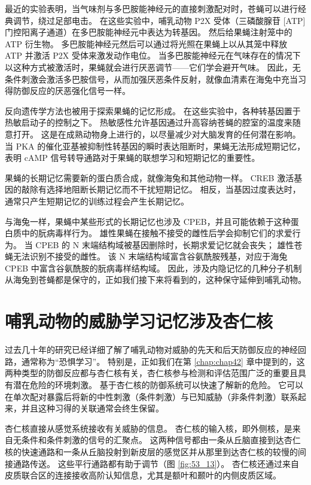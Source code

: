 最近的实验表明，当气味剂与多巴胺能神经元的直接刺激配对时，苍蝇可以进行经典调节，绕过足部电击。
在这些实验中，哺乳动物 P2X 受体（三磷酸腺苷 [ATP] 门控阳离子通道）在多巴胺能神经元中表达为转基因。
然后给果蝇注射笼中的 ATP 衍生物。
多巴胺能神经元然后可以通过将光照在果蝇上以从其笼中释放 ATP 并激活 P2X 受体来激发动作电位。
当多巴胺能神经元在气味存在的情况下以这种方式被激活时，果蝇就会进行厌恶调节——它们学会避开气味。
因此，无条件刺激会激活多巴胺信号，从而加强厌恶条件反射，就像血清素在海兔中充当习得防御反应的厌恶强化信号一样。


反向遗传学方法也被用于探索果蝇的记忆形成。
在这些实验中，各种转基因置于热敏启动子的控制之下。
热敏感性允许基因通过升高容纳苍蝇的腔室的温度来随意打开。
这是在成熟动物身上进行的，以尽量减少对大脑发育的任何潜在影响。
当 PKA 的催化亚基被抑制性转基因的瞬时表达阻断时，果蝇无法形成短期记忆，表明 cAMP 信号转导通路对于果蝇的联想学习和短期记忆的重要性。


果蝇的长期记忆需要新的蛋白质合成，就像海兔和其他动物一样。
CREB 激活基因的敲除有选择地阻断长期记忆而不干扰短期记忆。
相反，当基因过度表达时，通常只产生短期记忆的训练过程会产生长期记忆。


与海兔一样，果蝇中某些形式的长期记忆也涉及 CPEB，并且可能依赖于这种蛋白质中的朊病毒样行为。
雄性果蝇在接触不接受的雌性后学会抑制它们的求爱行为。
当 CPEB 的 N 末端结构域被基因删除时，长期求爱记忆就会丧失；
雄性苍蝇无法识别不接受的雌性。
该 N 末端结构域富含谷氨酰胺残基，对应于海兔 CPEB 中富含谷氨酰胺的朊病毒样结构域。
因此，涉及内隐记忆的几种分子机制从海兔到苍蝇都是保守的，正如我们接下来将看到的，这种保守延伸到哺乳动物。



\section{哺乳动物的威胁学习记忆涉及杏仁核}

过去几十年的研究已经详细了解了哺乳动物对威胁的先天和后天防御反应的神经回路，通常称为“恐惧学习”。
特别是，正如我们在第 \ref{chap:chap42} 章中提到的，这两种类型的防御反应都与杏仁核有关，杏仁核参与检测和评估范围广泛的重要且具有潜在危险的环境刺激。
基于杏仁核的防御系统可以快速了解新的危险。
它可以在单次配对暴露后将新的中性刺激（条件刺激）与已知威胁（非条件刺激）联系起来，并且这种习得的关联通常会终生保留。


杏仁核直接从感觉系统接收有关威胁的信息。
杏仁核的输入核，即外侧核，是来自无条件和条件刺激的信号的汇聚点。
这两种信号都由一条从丘脑直接到达杏仁核的快速通路和一条从丘脑投射到新皮层的感觉区并从那里到达杏仁核的较慢的间接通路传送。
这些平行通路都有助于调节（图 \ref{fig:53_13}）。
杏仁核还通过来自皮质联合区的连接接收高阶认知信息，尤其是额叶和颞叶的内侧皮质区域。


